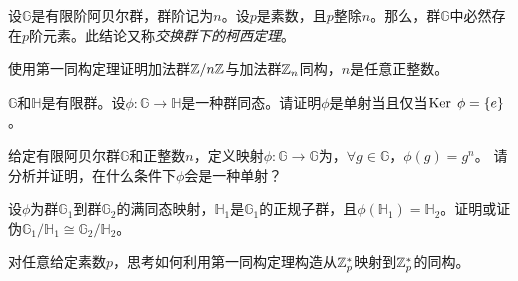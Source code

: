 \begin{problemset}
\item 设$\mathbb{G}$是有限阶阿贝尔群，群阶记为$n$。设$p$是素数，且$p$整除$n$。那么，群$\mathbb{G}$中必然存在$p$阶元素。此结论又称\emph{交换群下的柯西定理}。
\item 使用第一同构定理证明加法群${\mathbb Z} / n {\mathbb Z} $与加法群$ {\mathbb Z}_n$同构，$n$是任意正整数。

\item $\mathbb{G}$和$\mathbb{H}$是有限群。设$\phi\colon \mathbb{G}\to \mathbb{H}$是一种群同态。请证明$\phi$是单射当且仅当$\operatorname{Ker}\; \phi  = \{e\}$。

\item 给定有限阿贝尔群$\mathbb{G}$和正整数$n$，定义映射$\phi\colon \mathbb{G}\to \mathbb{G}$为，$\forall g \in \mathbb{G}$，$\phi(g) = g^n$。
请分析并证明，在什么条件下$\phi$会是一种单射？%

\item 设$\phi$为群$\mathbb{G}_1$到群$\mathbb{G}_2$的满同态映射，$\mathbb{H}_1$是$\mathbb{G}_1$的正规子群，且$\phi(\mathbb{H}_1) = \mathbb{H}_2$。证明或证伪$\mathbb{G}_1/ \mathbb{H}_1 \cong \mathbb{G}_2/ \mathbb{H}_2$。

\item 对任意给定素数$p$，思考如何利用第一同构定理构造从${\mathbb Z}_p^*$映射到${\mathbb Z}_p^*$的同构。%




\end{problemset}
